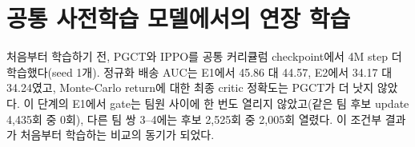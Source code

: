 \documentclass[twocolumn,10pt]{article}
\begin{document}
\section{공통 사전학습 모델에서의 연장 학습}
처음부터 학습하기 전, PGCT와 IPPO를 공통 커리큘럼 checkpoint에서 4M step 더 학습했다(seed 1개). 정규화 배송 AUC는 E1에서
45.86 대 44.57, E2에서 34.17 대 34.24였고, Monte-Carlo return에 대한 최종 critic 정확도는 PGCT가 더 낫지 않았다. 이 단계의 E1에서
gate는 팀원 사이에 한 번도 열리지 않았고(같은 팀 후보 update 4{,}435회 중 0회), 다른 팀 쌍 3--4에는 후보 2{,}525회 중 2{,}005회
열렸다. 이 조건부 결과가 처음부터 학습하는 비교의 동기가 되었다.
\end{document}
